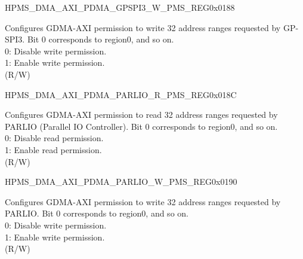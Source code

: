 \begin{register}{H}{PMS\_DMA\_AXI\_PDMA\_GPSPI3\_W\_PMS\_REG}{0x0188}\label{regdesc:PMSDMAAXIPDMAGPSPI3WPMSREG}
%
\regnewline%
\begin{regdesc}\begin{reglist}
\label{fielddesc:PMSDMAAXIPDMAGPSPI3WPMS}\item [PMS\_DMA\_AXI\_PDMA\_GPSPI3\_W\_PMS] Configures GDMA-AXI permission to write 32 address ranges requested by GP-SPI3. Bit 0 corresponds to region0, and so on.\\
0: Disable write permission.\\
1: Enable write permission.\\ (R/W)
\end{reglist}\end{regdesc}
\end{register}


\begin{register}{H}{PMS\_DMA\_AXI\_PDMA\_PARLIO\_R\_PMS\_REG}{0x018C}\label{regdesc:PMSDMAAXIPDMAPARLIORPMSREG}
%
\regnewline%
\begin{regdesc}\begin{reglist}
\label{fielddesc:PMSDMAAXIPDMAPARLIORPMS}\item [PMS\_DMA\_AXI\_PDMA\_PARLIO\_R\_PMS] Configures GDMA-AXI permission to read 32 address ranges requested by PARLIO (Parallel IO Controller). Bit 0 corresponds to region0, and so on.\\
0: Disable read permission.\\
1: Enable read permission.\\ (R/W)
\end{reglist}\end{regdesc}
\end{register}


\begin{register}{H}{PMS\_DMA\_AXI\_PDMA\_PARLIO\_W\_PMS\_REG}{0x0190}\label{regdesc:PMSDMAAXIPDMAPARLIOWPMSREG}
%
\regnewline%
\begin{regdesc}\begin{reglist}
\label{fielddesc:PMSDMAAXIPDMAPARLIOWPMS}\item [PMS\_DMA\_AXI\_PDMA\_PARLIO\_W\_PMS] Configures GDMA-AXI permission to write 32 address ranges requested by PARLIO. Bit 0 corresponds to region0, and so on.\\
0: Disable write permission.\\
1: Enable write permission.\\ (R/W)
\end{reglist}\end{regdesc}
\end{register}


